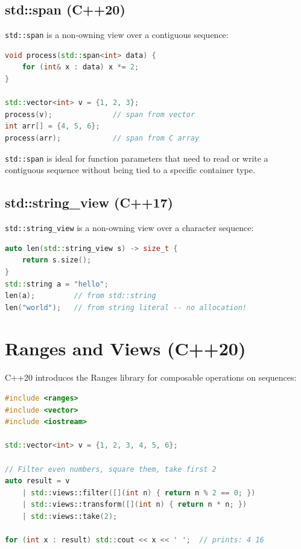 \subsection{std::span (C++20)}

\texttt{std::span} is a non-owning view over a contiguous sequence:

\begin{lstlisting}[language=C++]
void process(std::span<int> data) {
    for (int& x : data) x *= 2;
}

std::vector<int> v = {1, 2, 3};
process(v);              // span from vector
int arr[] = {4, 5, 6};
process(arr);            // span from C array
\end{lstlisting}

\texttt{std::span} is ideal for function parameters that need to read or write a contiguous sequence without being tied to a specific container type.

\subsection{std::string\_view (C++17)}

\texttt{std::string\_view} is a non-owning view over a character sequence:

\begin{lstlisting}[language=C++]
auto len(std::string_view s) -> size_t {
    return s.size();
}
std::string a = "hello";
len(a);         // from std::string
len("world");   // from string literal -- no allocation!
\end{lstlisting}

\section{Ranges and Views (C++20)}

C++20 introduces the Ranges library for composable operations on sequences:

\begin{lstlisting}[language=C++]
#include <ranges>
#include <vector>
#include <iostream>

std::vector<int> v = {1, 2, 3, 4, 5, 6};

// Filter even numbers, square them, take first 2
auto result = v
    | std::views::filter([](int n) { return n % 2 == 0; })
    | std::views::transform([](int n) { return n * n; })
    | std::views::take(2);

for (int x : result) std::cout << x << ' ';  // prints: 4 16
\end{lstlisting}

